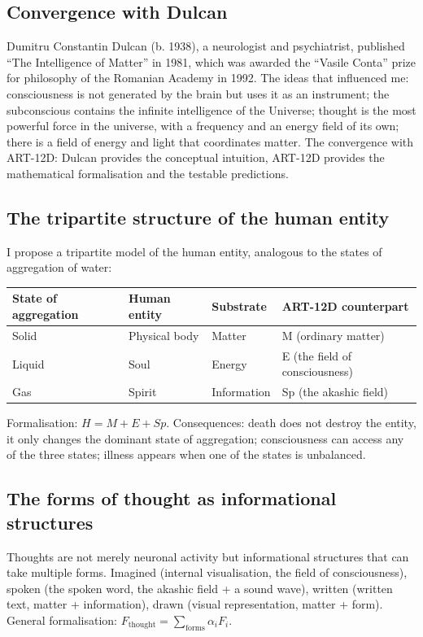 \subsection{Convergence with Dulcan}
Dumitru Constantin Dulcan (b. 1938), a neurologist and psychiatrist, published ``The Intelligence of Matter'' in 1981, which was awarded the ``Vasile Conta'' prize for philosophy of the Romanian Academy in 1992. The ideas that influenced me: consciousness is not generated by the brain but uses it as an instrument; the subconscious contains the infinite intelligence of the Universe; thought is the most powerful force in the universe, with a frequency and an energy field of its own; there is a field of energy and light that coordinates matter. The convergence with ART-12D: Dulcan provides the conceptual intuition, ART-12D provides the mathematical formalisation and the testable predictions.

\subsection{The tripartite structure of the human entity}
I propose a tripartite model of the human entity, analogous to the states of aggregation of water:
\begin{table}[H]
\centering
\begin{tabular}{@{}llll@{}}
\toprule
\textbf{State of aggregation} & \textbf{Human entity} & \textbf{Substrate} & \textbf{ART-12D counterpart} \\ \midrule
Solid & Physical body & Matter & M (ordinary matter) \\
Liquid & Soul & Energy & E (the field of consciousness) \\
Gas & Spirit & Information & Sp (the akashic field) \\ \bottomrule
\end{tabular}
\end{table}
Formalisation: $H = M + E + Sp$. Consequences: death does not destroy the entity, it only changes the dominant state of aggregation; consciousness can access any of the three states; illness appears when one of the states is unbalanced.

\subsection{The forms of thought as informational structures}
Thoughts are not merely neuronal activity but informational structures that can take multiple forms. Imagined (internal visualisation, the field of consciousness), spoken (the spoken word, the akashic field + a sound wave), written (written text, matter + information), drawn (visual representation, matter + form). General formalisation: $F_{\text{thought}} = \sum_{\text{forms}} \alpha_i F_i$.

